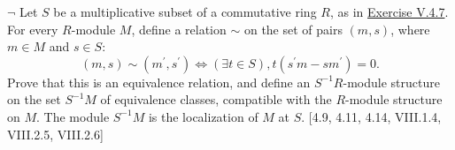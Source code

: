 \hypertarget{Exercise V.4.8}{}
\begin{problem}[4.8]
$\neg$ Let $S$ be a multiplicative subset of a commutative ring $R$, as in \hyperlink{Exercise V.4.7}{Exercise V.4.7}. For every $R$-module $M$, define a relation $\sim$ on the set of pairs $(m, s)$, where $m \in M$ and $s \in S$:
$$
(m, s) \sim\left(m^{\prime}, s^{\prime}\right) \Longleftrightarrow(\exists t \in S), t\left(s^{\prime} m-s m^{\prime}\right)=0 .
$$
Prove that this is an equivalence relation, and define an $S^{-1} R$-module structure on the set $S^{-1} M$ of equivalence classes, compatible with the $R$-module structure on $M$. The module $S^{-1} M$ is the localization of $M$ at $S$. [4.9, 4.11, 4.14, VIII.1.4, VIII.2.5, VIII.2.6]
\end{problem}
\begin{solution}
\end{solution}